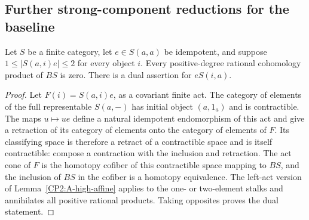 \subsection{Further strong-component reductions for the baseline}

\begin{lemma}
\label{CP2:A-baseline-binary-representable}
Let $S$ be a finite category, let $e\in S(a,a)$ be idempotent,
and suppose $1\leq |S(a,i)e|\leq2$ for every object $i$.
Every positive-degree rational cohomology product of $BS$
is zero.  There is a dual assertion for $eS(i,a)$.
\end{lemma}
\begin{proof}
Let $F(i)=S(a,i)e$, as a covariant finite act.  The category
of elements of the full representable $S(a,-)$ has initial
object $(a,1_a)$ and is contractible.  The maps $u\mapsto ue$
define a natural idempotent endomorphism of this act and
give a retraction of its category of elements onto the
category of elements of $F$.  Its classifying space is
therefore a retract of a contractible space and is itself
contractible: compose a contraction with the inclusion and
retraction.  The act cone of $F$ is the homotopy cofiber of
this contractible space mapping to $BS$, and the inclusion
of $BS$ in the cofiber is a homotopy equivalence.  The
left-act version of Lemma~\ref{CP2:A-high-affine} applies
to the one- or two-element stalks and annihilates all
positive rational products.  Taking opposites proves the
dual statement.
\end{proof}

